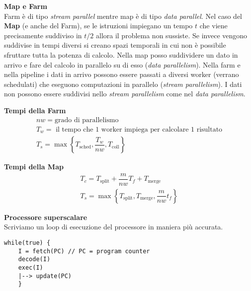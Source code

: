 \begin{defn}
	\textbf{Map e Farm} \\
	Farm è di tipo \textit{stream parallel} mentre map è di tipo \textit{data
	parallel}. Nel caso del \textbf{Map} (e anche del Farm), se le  istruzioni
	impiegano un tempo $ t $ che viene precisamente suddiviso in $ t/2 $ allora il
	problema non sussiste. Se invece vengono suddivise in tempi diversi si creano
	spazi temporali in cui non è possibile sfruttare tutta la potenza di calcolo.
	Nella map posso suddividere un dato in arrivo e fare del calcolo in parallelo su
	di esso (\textit{data parallelism}). Nella farm e nella pipeline i dati in
	arrivo possono essere passati a diversi worker (verrano schedulati) che eseguono
	computazioni in parallelo (\textit{stream parallelism}). I dati non possono
	essere suddivisi nello \textit{stream parallelism} come nel \textit{data
	parallelism}.
	
	\textbf{Tempi della Farm}\\
	\[ \begin{aligned}
	nw = \text{grado di parallelismo}\\
	T_w = \text{ il tempo che 1 worker impiega per calcolare 1 risultato} \\
	T_s = \max\left\{T_{\text{sched}}, \dfrac{T_w}{nw}, T_{\text{coll}}\right\}
	\end{aligned} \]
	
	\textbf{Tempi della Map}\\
	\[ \begin{aligned}
	T_c = T_\text{split} + \dfrac{m}{nw} T_f + T_\text{merge} \\
	T_s = \max\left\{T_\text{split}, T_\text{merge}, \dfrac{m}{nw}t_f\right\}
	\end{aligned} \]
\end{defn}


\begin{defn}
	\textbf{Processore superscalare}\\
	
	Scriviamo un loop di esecuzione del processore in maniera più accurata.
	
	\begin{lstlisting}[frame=single]
	while(true) {
	I = fetch(PC) // PC = program counter
	decode(I)
	exec(I)
	|--> update(PC)
	}
	\end{lstlisting}
\end{defn}


